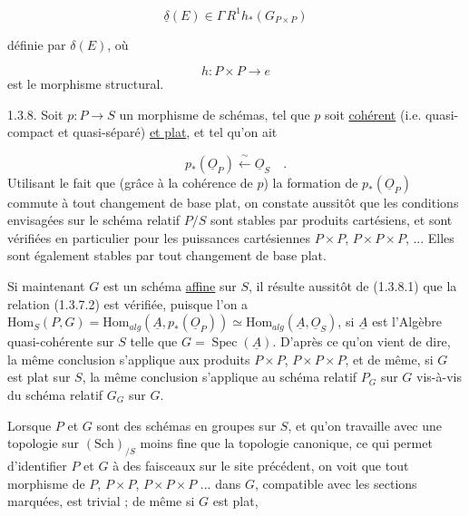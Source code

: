 \begin{equation*}
\underline{\delta}(E) \in \Gamma\, R^1 h_*(G_{P\times P}) 
\end{equation*}




 définie par $\delta(E)$, où

\begin{equation*}
h : P \times P \longrightarrow e
\end{equation*}
est le morphisme structural.

1.3.8.  Soit $p : P \longrightarrow S$ un morphisme de schémas, tel que $p$ soit \underline{cohérent} (i.e. quasi-compact et quasi-séparé) \underline{et plat}, et tel qu'on ait

\begin{equation}\tag{1.3.8.1}
p_*(\underline{O}_P) \xleftarrow{\ \sim\ } \underline{O}_S \quad .
\end{equation}
Utilisant le fait que (grâce à la cohérence de $p$) la formation de $p_*(\underline{O}_P)$ commute à tout changement de base plat, on constate aussitôt que les conditions envisagées sur le schéma relatif $P/S$ sont stables par produits cartésiens, et sont vérifiées en particulier pour les puissances cartésiennes $P\times P$, $P\times P\times P$, ... Elles sont également stables par tout changement de base plat.

Si maintenant $G$ est un schéma \underline{affine} sur $S$, il résulte aussitôt de (1.3.8.1) que la relation (1.3.7.2) est vérifiée, puisque l'on a $\mathrm{Hom}_S(P,G) = \mathrm{Hom}_{alg}(\underline{A},p_*(\underline{O}_P)) \simeq \mathrm{Hom}_{alg}(\underline{A},\underline{O}_S)$, si $\underline{A}$ est l'Algèbre quasi-cohérente sur $S$ telle que $G = \operatorname{Spec}(\underline{A})$. D'après ce qu'on vient de dire, la même conclusion s'applique aux produits $P\times P$, $P\times P\times P$, et de même, si $G$ est plat sur $S$, la même conclusion s'applique au schéma relatif $P_G$ sur $G$ vis-à-vis du schéma relatif $G_G$ sur $G$.

Lorsque $P$ et $G$ sont des schémas en groupes sur $S$, et qu'on travaille avec une topologie sur $(\mathrm{Sch})_{/S}$ moins fine que la topologie canonique, ce qui permet d'identifier $P$ et $G$ à des faisceaux sur le site précédent, on voit que tout morphisme de $P$, $P\times P$, $P\times P\times P$ ... dans $G$, compatible avec les sections marquées, est trivial ; de même si $G$ est plat, 

